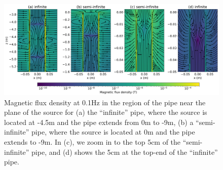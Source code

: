 \begin{figure}
    \begin{center}
    \includegraphics[width=\columnwidth]{figures/AugustinBfields.png}
    \end{center}
\caption{
    Magnetic flux density at 0.1Hz in the region of the pipe near the plane of the source for
    (a) the ``infinite'' pipe, where the source is located at -4.5m and the pipe extends from 0m to -9m,
    (b) a ``semi-infinite'' pipe, where the source is located at 0m and the pipe extends to -9m.
    In (c), we zoom in to the top 5cm of the ``semi-infinite'' pipe,
    and (d) shows the 5cm at the top-end of the ``infinite'' pipe.
}
\label{fig:AugustinBfields}
\end{figure}
